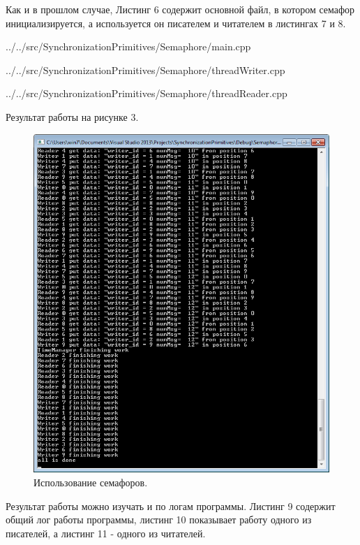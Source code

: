 \documentclass[a4paper, 12pt]{article}		%
\begin{document}
Как и в прошлом случае, Листинг 6 содержит основной файл, в котором семафор инициализируется, а используется он писателем и читателем в листингах 7 и 8.


{../../src/SynchronizationPrimitives/Semaphore/main.cpp}
\newpage


{../../src/SynchronizationPrimitives/Semaphore/threadWriter.cpp}


{../../src/SynchronizationPrimitives/Semaphore/threadReader.cpp}

Результат работы на рисунке 3.

\begin{figure}[h!]
\centering
\includegraphics[scale=0.99]{res/002}
\caption{Использование семафоров.}
\end{figure}

Результат работы можно изучать и по логам программы. Листинг 9 содержит общий лог работы программы, листинг 10 показывает работу одного из писателей, а листинг 11 - одного из читателей.
\end{document}
